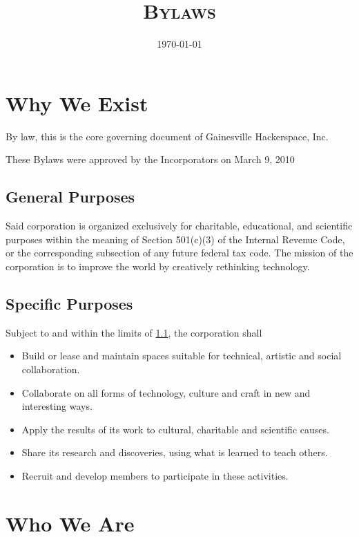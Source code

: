 \documentclass[10pt,letterpaper,titlepage]{article}
\title{%
    \textsc{\LARGE \corpname \\
    \Large Bylaws
    }
}
\date{\today}
\newcommand\corpname{Gainesville Hackerspace, Inc.}
\newcommand\approvaldate{March 9, 2010}
\begin{document}
\maketitle

\tableofcontents
\newpage

\section{Why We Exist}
\label{whyweexist}

By law, this is the core governing document of \corpname

These Bylaws were approved by the Incorporators on \approvaldate

\subsection{General Purposes}
\label{genpurp}

Said corporation is organized exclusively for charitable, educational, and
scientific purposes within the meaning of Section 501(c)(3) of the Internal
Revenue Code, or the corresponding subsection of any future federal tax code.
The mission of the corporation is to improve the world by creatively rethinking
technology. 

\subsection{Specific Purposes}

Subject to and within the limits of \ref{genpurp}, the corporation shall
\begin{itemize}
    \item Build or lease and maintain spaces suitable for technical, artistic
          and social collaboration.
    \item Collaborate on all forms of technology, culture and craft in new and
          interesting ways.
    \item Apply the results of its work to cultural, charitable and
          scientific causes.
    \item Share its research and discoveries, using what is learned to
          teach others.
    \item Recruit and develop members to participate in these activities.
\end{itemize}

\section{Who We Are}
\end{document}

